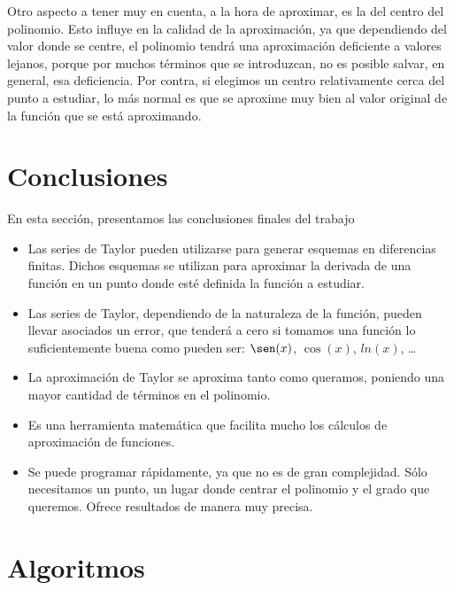 \documentclass[a4paper,12pt]{report}
\begin{document}
Otro aspecto a tener muy en cuenta, a la hora de aproximar, es la del centro del polinomio. Esto influye en la calidad de la aproximación, ya
que dependiendo del valor donde se centre, el polinomio tendrá una aproximación deficiente a valores lejanos, porque por muchos términos que 
se introduzcan, no es posible salvar, en general, esa deficiencia. Por contra, si elegimos un centro relativamente cerca del punto a estudiar, 
lo más normal es que se aproxime muy bien al valor original de la función que se está aproximando.

\chapter{Conclusiones}
En esta sección, presentamos las conclusiones finales del trabajo
\begin{itemize}
 \item Las series de Taylor pueden utilizarse para generar esquemas en diferencias finitas. Dichos esquemas se utilizan para aproximar la 
 derivada de una función en un punto donde esté definida la función a estudiar.
 \item Las series de Taylor, dependiendo de la naturaleza de la función, pueden llevar asociados un error, que tenderá a cero si tomamos una
 función lo suficientemente buena como pueden ser: $\sen(x)$, $\cos(x)$, $ln(x)$, \ldots
 \item La aproximación de Taylor se aproxima tanto como queramos, poniendo una mayor cantidad de términos en el polinomio.
 \item Es una herramienta matemática que facilita mucho los cálculos de aproximación de funciones.
 \item Se puede programar rápidamente, ya que no es de gran complejidad. Sólo necesitamos un punto, un lugar donde centrar el polinomio y 
el grado que queremos. Ofrece resultados de manera muy precisa.
\end{itemize}



\appendix
\chapter{Algoritmos}
\end{document}
